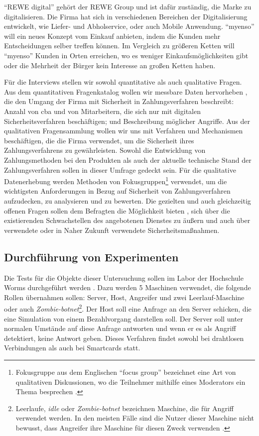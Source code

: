 ``REWE digital'' gehört der REWE Group und ist dafür zuständig, die Marke zu digitalisieren. Die Firma hat sich in verschiedenen 
Bereichen der Digitalisierung entwickelt, wie Liefer- und Abholservice, oder auch Mobile Anwendung. ``myenso'' will ein 
neues Konzept vom Einkauf anbieten, indem die Kunden mehr Entscheidungen selber treffen können. Im Vergleich zu größeren
Ketten will ``myenso'' Kunden in Orten erreichen, wo es weniger Einkaufsmöglichkeiten gibt oder die Mehrheit der Bürger
kein Interesse an großen Ketten haben.


Für die Interviews stellen wir sowohl quantitative als auch qualitative Fragen. Aus dem quantitativen Fragenkatalog
wollen wir messbare Daten hervorheben \cite{refbook:SRJR}, die den Umgang der Firma mit Sicherheit in Zahlungsverfahren
beschreibt: Anzahl von \acrfull{cba} und von Mitarbeitern, die sich nur mit digitalen Sicherheitsverfahren beschäftigen;
und Beschreibung möglicher Angriffe. Aus der qualitativen Fragensammlung wollen wir uns mit Verfahren 
und Mechanismen beschäftigen, die die Firma verwendet, um die Sicherheit ihres Zahlungsverfahrens zu gewährleisten. 
Sowohl die Entwicklung von Zahlungsmethoden bei den Produkten als auch der aktuelle technische Stand der Zahlungsverfahren
sollen in dieser Umfrage gedeckt sein. Für die qualitative Datenerhebung werden Methoden von Fokusgruppen\footnote{Fokusgruppe
aus dem Englischen ``focus group'' bezeichnet eine Art von qualitativen Diskussionen, wo die Teilnehmer mithilfe eines 
Moderators ein Thema besprechen \cite{refbook:APGF}.} verwendet, um die wichtigsten Anforderungen in Bezug auf Sicherheit von 
Zahlungsverfahren aufzudecken, zu analysieren und zu bewerten. Die gezielten und auch gleichzeitig offenen Fragen sollen dem
Befragten die Möglichkeit bieten \cite{refbook:EFAF}, sich über die existierenden Schwachstellen des angebotenen
Dienstes zu äußern und auch über verwendete oder in Naher Zukunft verwendete Sicherheitsmaßnahmen.

\subsection{Durchführung von Experimenten}

Die Tests für die Objekte dieser Untersuchung sollen im Labor der Hochschule Worms durchgeführt werden \cite{refbook:FWDL}.
Dazu werden 5 Maschinen verwendet, die folgende Rollen übernahmen sollen: Server, Host, Angreifer und zwei Leerlauf-Maschine 
oder auch \textit{Zombie-botnet}\footnote{Leerlaufe, \textit{idle} oder \textit{Zombie-botnet} bezeichnen Maschine, die für Angriff
verwendet werden. In den meisten Fälle sind die Nutzer dieser Maschine nicht bewusst, dass Angreifer ihre Maschine für diesen 
Zweck verwenden \cite{refart:XGDD}.}. Der Host soll eine Anfrage an den Server schicken, die eine Simulation von einem Bezahlvorgang 
darstellen soll. Der Server soll unter normalen Umstände auf diese Anfrage antworten und wenn er es als Angriff detektiert, keine 
Antwort geben. Dieses Verfahren findet sowohl bei drahtlosen Verbindungen als auch bei Smartcards statt.


